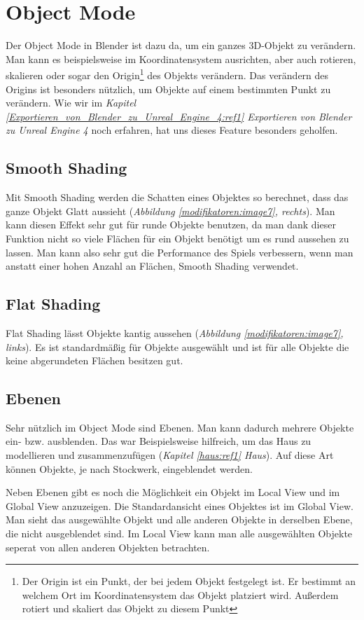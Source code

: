 \section{Object Mode}
Der Object Mode in Blender ist dazu da, um ein ganzes 3D-Objekt zu verändern. Man kann es beispielsweise im Koordinatensystem ausrichten, aber
auch rotieren, skalieren oder sogar den Origin\footnote{Der Origin ist ein Punkt, der bei jedem Objekt festgelegt ist. Er bestimmt an welchem Ort im Koordinatensystem das Objekt platziert wird. Außerdem rotiert und skaliert das Objekt zu diesem Punkt}
des Objekts verändern. Das verändern des Origins ist besonders nützlich, um Objekte auf einem bestimmten Punkt zu verändern.
Wie wir im \textit{Kapitel \ref{Exportieren_von_Blender_zu_Unreal_Engine_4:ref1} \dq Exportieren von Blender zu Unreal Engine 4\dq} noch erfahren, hat uns dieses Feature besonders geholfen.

\subsection{Smooth Shading}
\label{objectMode:smoothshading}
Mit Smooth Shading werden die Schatten eines Objektes so berechnet, dass das ganze Objekt Glatt aussieht (\textit{Abbildung \ref{modifikatoren:image7}, rechts}).\citep{smoothshading:link}
Man kann diesen Effekt sehr gut für runde Objekte benutzen, da man dank dieser Funktion nicht so viele Flächen für ein Objekt benötigt um
es rund aussehen zu lassen. Man kann also sehr gut die Performance des Spiels verbessern, wenn man anstatt einer hohen Anzahl an Flächen, Smooth Shading verwendet.

\subsection{Flat Shading}
Flat Shading lässt Objekte kantig aussehen (\textit{Abbildung \ref{modifikatoren:image7}, links}).
Es ist standardmäßig für Objekte ausgewählt und ist für alle Objekte die keine abgerundeten Flächen besitzen gut.

\subsection{Ebenen}
Sehr nützlich im Object Mode sind Ebenen. Man kann dadurch mehrere Objekte ein- bzw. ausblenden.
Das war Beispielsweise hilfreich, um das Haus zu modellieren und zusammenzufügen (\textit{Kapitel \ref{haus:ref1} \dq Haus\dq}).
Auf diese Art können Objekte, je nach Stockwerk, eingeblendet werden.

Neben Ebenen gibt es noch die Möglichkeit ein Objekt im Local View und im Global View anzuzeigen.
Die Standardansicht eines Objektes ist im Global View. Man sieht das ausgewählte Objekt und alle anderen Objekte in derselben Ebene, die nicht ausgeblendet sind.
Im Local View kann man alle ausgewählten Objekte seperat von allen anderen Objekten betrachten.
